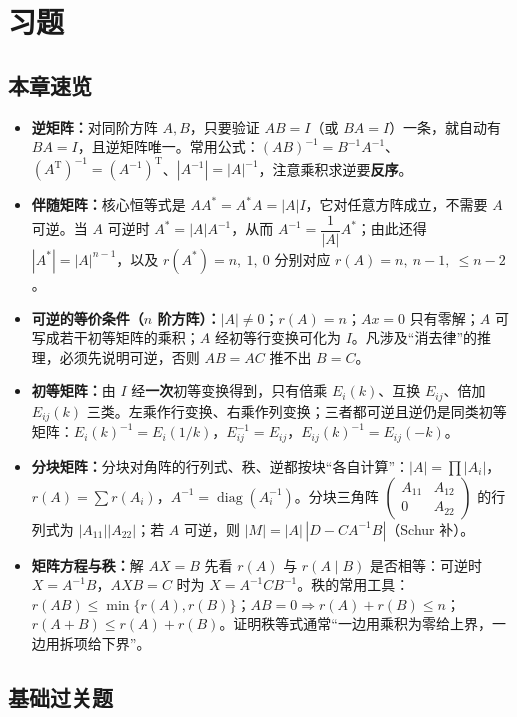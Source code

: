 \section{习题}

\subsection{本章速览}

\begin{itemize}
\item \textbf{逆矩阵：}对同阶方阵 \(A,B\)，只要验证 \(AB=I\)（或 \(BA=I\)）一条，就自动有 \(BA=I\)，且逆矩阵唯一。常用公式：\((AB)^{-1}=B^{-1}A^{-1}\)、\((A^{\mathrm T})^{-1}=(A^{-1})^{\mathrm T}\)、\(|A^{-1}|=|A|^{-1}\)，注意乘积求逆要\textbf{反序}。
\item \textbf{伴随矩阵：}核心恒等式是 \(AA^*=A^*A=|A|I\)，它对任意方阵成立，不需要 \(A\) 可逆。当 \(A\) 可逆时 \(A^*=|A|A^{-1}\)，从而 \(A^{-1}=\dfrac{1}{|A|}A^*\)；由此还得 \(|A^*|=|A|^{n-1}\)，以及 \(r(A^*)=n,\ 1,\ 0\) 分别对应 \(r(A)=n,\ n-1,\ \le n-2\)。
\item \textbf{可逆的等价条件（\(n\) 阶方阵）：}\(|A|\neq 0\)；\(r(A)=n\)；\(Ax=0\) 只有零解；\(A\) 可写成若干初等矩阵的乘积；\(A\) 经初等行变换可化为 \(I\)。凡涉及“消去律”的推理，必须先说明可逆，否则 \(AB=AC\) 推不出 \(B=C\)。
\item \textbf{初等矩阵：}由 \(I\) 经\textbf{一次}初等变换得到，只有倍乘 \(E_i(k)\)、互换 \(E_{ij}\)、倍加 \(E_{ij}(k)\) 三类。左乘作行变换、右乘作列变换；三者都可逆且逆仍是同类初等矩阵：\(E_i(k)^{-1}=E_i(1/k)\)，\(E_{ij}^{-1}=E_{ij}\)，\(E_{ij}(k)^{-1}=E_{ij}(-k)\)。
\item \textbf{分块矩阵：}分块对角阵的行列式、秩、逆都按块“各自计算”：\(|A|=\prod |A_i|\)，\(r(A)=\sum r(A_i)\)，\(A^{-1}=\operatorname{diag}(A_i^{-1})\)。分块三角阵 \(\begin{pmatrix}A_{11}&A_{12}\\0&A_{22}\end{pmatrix}\) 的行列式为 \(|A_{11}||A_{22}|\)；若 \(A\) 可逆，则 \(|M|=|A|\,|D-CA^{-1}B|\)（Schur 补）。
\item \textbf{矩阵方程与秩：}解 \(AX=B\) 先看 \(r(A)\) 与 \(r(A\mid B)\) 是否相等：可逆时 \(X=A^{-1}B\)，\(AXB=C\) 时为 \(X=A^{-1}CB^{-1}\)。秩的常用工具：\(r(AB)\le\min\{r(A),r(B)\}\)；\(AB=0\Rightarrow r(A)+r(B)\le n\)；\(r(A+B)\le r(A)+r(B)\)。证明秩等式通常“一边用乘积为零给上界，一边用拆项给下界”。
\end{itemize}

\subsection{基础过关题}

